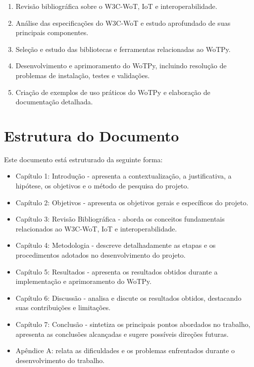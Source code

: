 \begin{enumerate}
    \item Revisão bibliográfica sobre o W3C-WoT, IoT e interoperabilidade.
    \item Análise das especificações do W3C-WoT e estudo aprofundado de suas principais componentes.
\item Seleção e estudo das bibliotecas e ferramentas relacionadas   ao WoTPy.
    \item Desenvolvimento e aprimoramento do WoTPy, incluindo resolução de problemas de instalação, testes e validações.
    \item Criação de exemplos de uso práticos do WoTPy e elaboração de documentação detalhada.
\end{enumerate}

\section{Estrutura do Documento}

Este documento está estruturado da seguinte forma:

\begin{itemize}
    \item Capítulo 1: Introdução - apresenta a contextualização, a justificativa, a hipótese, os objetivos e o método de pesquisa do projeto.
    \item Capítulo 2: Objetivos - apresenta os objetivos gerais e específicos do projeto.
    \item Capítulo 3: Revisão Bibliográfica - aborda os conceitos fundamentais relacionados ao W3C-WoT, IoT e interoperabilidade.
    \item Capítulo 4: Metodologia - descreve detalhadamente as etapas e os procedimentos adotados no desenvolvimento do projeto.
    \item Capítulo 5: Resultados - apresenta os resultados obtidos durante a implementação e aprimoramento do WoTPy.
    \item Capítulo 6: Discussão - analisa e discute os resultados obtidos, destacando suas contribuições e limitações.
    \item Capítulo 7: Conclusão - sintetiza os principais pontos abordados no trabalho, apresenta as conclusões alcançadas e sugere possíveis direções futuras.
    \item Apêndice A: relata as dificuldades e os problemas enfrentados durante o desenvolvimento do trabalho.
\end{itemize}

